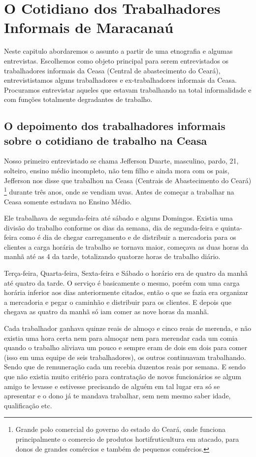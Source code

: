 \chapter{O Cotidiano dos Trabalhadores Informais de Maracanaú}

 Neste capitulo abordaremos o assunto a partir de uma etnografia e algumas entrevistas. Escolhemos como objeto principal para serem entrevistados os trabalhadores informais da Ceasa (Central de abastecimento do Ceará), entrevististamos alguns trabalhadores e ex-trabalhadores informais da 
 Ceasa. Procuramos entrevistar aqueles que estavam trabalhando na total informalidade e com funções totalmente degradantes de trabalho.
 
 \section{O depoimento dos trabalhadores informais sobre o cotidiano de trabalho na Ceasa}
 
 Nosso primeiro entrevistado se chama Jefferson Duarte, masculino, pardo, 21, solteiro, ensino médio incompleto, não tem filho e ainda mora com os pais, Jefferson nos disse que trabalhou na Ceasa (Centrais de Abastecimento do Ceará) \footnote{Grande polo comercial do governo do estado do Ceará, onde funciona principalmente o comercio de produtos hortifruticultura em atacado, para donos de grandes comércios e também de pequenos comércios.} durante três anos, onde se vendiam uvas. Antes de começar a trabalhar na Ceasa somente estudava no Ensino Médio. 
 
 Ele trabalhava de segunda-feira até sábado e alguns Domingos. Existia uma divisão do trabalho conforme os dias da semana, dia de segunda-feira e quinta-feira como é dia de chegar carregamento e de distribuir a mercadoria para os clientes a carga horária de trabalho se tornava maior, começava as duas horas da manhã até as 4 da tarde, totalizando quatorze horas de trabalho diário.
 
 Terça-feira, Quarta-feira, Sexta-feira e Sábado o horário era de quatro da manhã até quatro da tarde. O serviço é basicamente o mesmo, porém com uma carga horária inferior aos dias anteriormente citados, então o que se fazia era organizar a mercadoria e pegar o caminhão e distribuir para os clientes. E depois que chegava as quatro da manhã só iam comer as nove horas da manhã. 
 
 Cada trabalhador ganhava quinze reais de almoço e cinco reais de merenda, e não existia uma hora certa nem para almoçar nem para merendar cada um comia quando o trabalho aliviava um pouco e sempre eram de dois em dois para comer (isso em uma equipe de seis trabalhadores), os outros continuavam trabalhando. Sendo que de remuneração cada um recebia duzentos reais por semana. E sendo que não existia muito critério para contratação de novos funcionários se algum amigo te levasse e estivesse precisando de alguém em tal lugar era só se apresentar e o dono já te mandava trabalhar, sem nem mesmo saber idade, qualificação etc.

